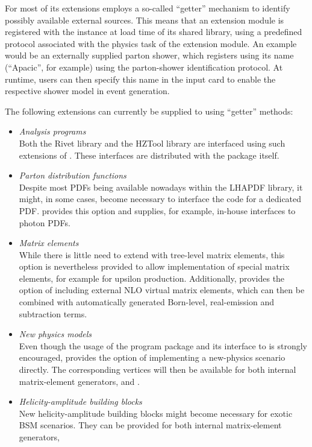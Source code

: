 For most of its extensions \Sherpa employs a so-called ``getter''
mechanism to identify possibly available external sources.
This means that an extension module is registered with the \Sherpa
instance at load time of its shared library, using a predefined
protocol associated with the physics task of the extension module.
An example would be an externally supplied parton shower,
which registers using its name (``Apacic'', for example) using the 
parton-shower identification protocol. At runtime, users can then 
specify this name in the input card to enable the respective shower
model in event generation.

The following extensions can currently be supplied to \Sherpa using 
``getter'' methods:
\begin{itemize}
\item {\em Analysis programs}\\
Both the Rivet library and the HZTool library are interfaced 
using such extensions of \Sherpa. These interfaces are distributed 
with the \Sherpa package itself.
\item {\em Parton distribution functions}\\
Despite most PDFs being available nowadays within the LHAPDF library, 
it might, in some cases, become necessary to interface the code for
a dedicated PDF. \Sherpa provides this option and supplies, for example,
in-house interfaces to photon PDFs.
\item {\em Matrix elements}\\
While there is little need to extend \Sherpa with tree-level matrix 
elements, this option is nevertheless provided to allow implementation 
of special matrix elements, for example for upsilon production.
Additionally, \Sherpa provides the option of including external NLO virtual
matrix elements, which can then be combined with automatically generated
Born-level, real-emission and subtraction terms.
\item {\em New physics models}\\
Even though the usage of the \FeynRules program package and its interface 
to \Sherpa is strongly encouraged, \Sherpa provides the option of implementing
a new-physics scenario directly. The corresponding vertices will then be
available for both internal matrix-element generators, \Amegic and \Comix.
\item {\em Helicity-amplitude building blocks}\\
New helicity-amplitude building blocks might become necessary for exotic BSM scenarios.
They can be provided for both internal matrix-element generators, 

\end{itemize}
